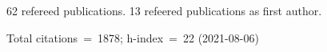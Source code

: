 62 refereed publications. 13 refeered publications as first author.

Total citations~=~1878; h-index~=~22 (2021-08-06)